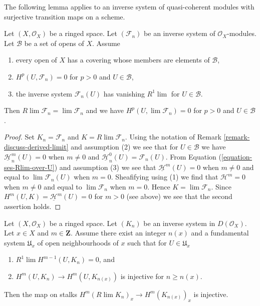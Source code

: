 \noindent
The following lemma applies to an inverse system of quasi-coherent
modules with surjective transition maps on a scheme.

\begin{lemma}
\label{lemma-inverse-limit-is-derived-limit}
Let $(X, \mathcal{O}_X)$ be a ringed space. Let $(\mathcal{F}_n)$ be an
inverse system of $\mathcal{O}_X$-modules. Let $\mathcal{B}$ be a set
of opens of $X$. Assume
\begin{enumerate}
\item every open of $X$ has a covering whose members are elements of
$\mathcal{B}$,
\item $H^p(U, \mathcal{F}_n) = 0$ for $p > 0$ and $U \in \mathcal{B}$,
\item the inverse system $\mathcal{F}_n(U)$ has vanishing $R^1\lim$
for $U \in \mathcal{B}$.
\end{enumerate}
Then $R\lim \mathcal{F}_n = \lim \mathcal{F}_n$ and we have
$H^p(U, \lim \mathcal{F}_n) = 0$ for $p > 0$ and $U \in \mathcal{B}$.
\end{lemma}

\begin{proof}
Set $K_n = \mathcal{F}_n$ and $K = R\lim \mathcal{F}_n$. Using the notation
of Remark \ref{remark-discuss-derived-limit} and assumption (2) we see that for
$U \in \mathcal{B}$ we have $\underline{\mathcal{H}}_n^m(U) = 0$
when $m \not = 0$ and $\underline{\mathcal{H}}_n^0(U) = \mathcal{F}_n(U)$.
From Equation (\ref{equation-ses-Rlim-over-U}) and assumption (3)
we see that $\underline{\mathcal{H}}^m(U) = 0$
when $m \not = 0$ and equal to $\lim \mathcal{F}_n(U)$
when $m = 0$. Sheafifying using (1) we find that
$\mathcal{H}^m = 0$ when $m \not = 0$ and equal to
$\lim \mathcal{F}_n$ when $m = 0$. Hence $K = \lim \mathcal{F}_n$.
Since $H^m(U, K) = \underline{\mathcal{H}}^m(U) = 0$ for $m > 0$
(see above) we see that the second assertion holds.
\end{proof}

\begin{lemma}
\label{lemma-cohomology-derived-limit-injective}
Let $(X, \mathcal{O}_X)$ be a ringed space. Let $(K_n)$ be an
inverse system in $D(\mathcal{O}_X)$. Let $x \in X$ and $m \in \mathbf{Z}$.
Assume there exist an integer $n(x)$ and a fundamental system $\mathfrak{U}_x$
of open neighbourhoods of $x$ such that for $U \in \mathfrak{U}_x$
\begin{enumerate}
\item $R^1\lim H^{m - 1}(U, K_n) = 0$, and
\item $H^m(U, K_n) \to H^m(U, K_{n(x)})$ is injective
for $n \geq n(x)$.
\end{enumerate}
Then the map on stalks $H^m(R\lim K_n)_x \to H^m(K_{n(x)})_x$ is injective.
\end{lemma}

